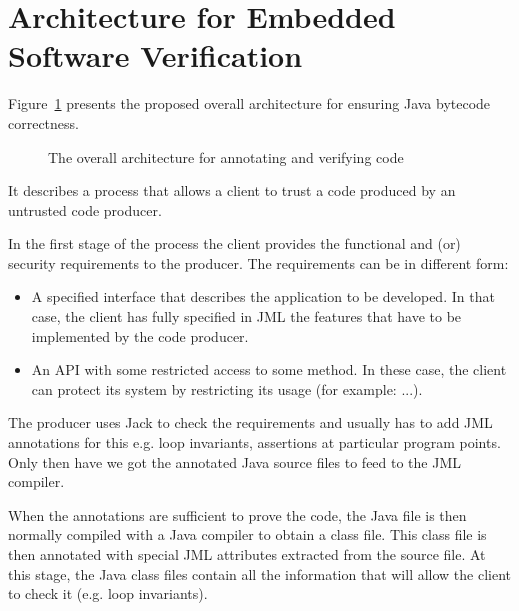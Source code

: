 \section{Architecture for Embedded Software Verification}
\label{architecture_s}	
Figure~\ref{architecture} presents the proposed overall architecture for ensuring Java bytecode correctness. 
\begin{figure}[ht!]
\begin{center}
\caption{The overall architecture for annotating and verifying code}
\label{architecture}
\end{center}
\end{figure}
It describes a process that allows a client to trust a code produced by an untrusted code producer.

In the first stage of the process the client provides the functional and (or) security requirements to the producer. The requirements can be in different form:
\begin{itemize}
\item A specified interface that describes the application to be developed. In that case, the client has fully specified in JML the features that have to be implemented by the code producer.
\item An API with some restricted access to some method. In these case, the client can protect its system by restricting its usage (for example: ...). 
\end{itemize}
The producer uses Jack to check the requirements and usually has to add JML annotations for this %
e.g. loop invariants, assertions at particular program points. Only then have we got the annotated Java source files to feed to the JML compiler.

When the annotations are sufficient to prove the code, 
the Java file is then normally compiled with a Java compiler to obtain a 
class file. 
This class file is then annotated with special JML attributes extracted from the source file. 
At this stage, the Java class files contain all the information that will allow the client to check it (e.g. loop invariants). 
 
